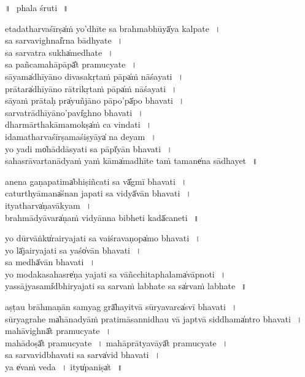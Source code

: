 \documentclass[parskip, DIV=14]{scrartcl}
\begin{document}
\vspace{1cm}
॥\,~phala śruti\,~॥ \\
\vspace{0.5cm}

etadatharvaśīrṣa̍ṁ yo’dhī॒te sa brahmabhūyā̍ya ka॒lpate\,~।\\ sa sarvavighnai̎rna bā॒dhyate\,~।\\
sa sarvatra sukha̍medha॒te\,~।\\
sa pañcamahāpāpā̎t pramu॒cyate\,~।\\
sā॒yama̍dhīyā॒no॒ divasakṛtaṁ pāpa̍ṁ nāśa॒yati\,~।\\ prā॒tara̍dhīyā॒no॒ rātrikṛtaṁ pāpa̍ṁ nāśa॒yati\,~।\\ sāyaṁ prātaḥ pra̍yuñjā॒no॒ pāpo’pā̍po bha॒vati\,~।\\ sarvatrādhīyāno’pavi̍ghno bha॒vati\,~।\\ 
dharmārthakāmamokṣa̍ṁ ca vi॒ndati\,~।\\ idamatharvaśīrṣamaśiṣyāya̍ na de॒yam\,~।\\
yo yadi mo̍hāddā॒syati sa pāpī̍yān bha॒vati\,~।\\ 
sahasrāvartanādyaṁ yaṁ kāma̍madhī॒te taṁ tamane̍na
sā॒dhayet\,~॥\\

\vspace{1cm}

anena gaṇapatima̍bhiṣi॒ñcati sa vā̎gmī bha॒vati\,~।\\
caturthyāmana̍śnan ja॒pati sa vidyā̍vān bha॒vati\,~।\\
ityatharva̍ṇavā॒kyam\,~।\\
brahmādyā॒vara̍ṇaṁ vi॒dyānna bibheti kadā̍cane॒ti\,~॥\\

\vspace{1cm}

yo dūrvāṅku̍rairya॒jati sa vaiśravaṇopa̍mo bha॒vati\,~।\\ yo lā̍jairya॒jati sa yaśo̍vān bha॒vati\,~।\\
sa medhā̍vān bha॒vati\,~।\\
yo modakasahasre̍ṇa ya॒jati sa vāñcchitaphalama̍vāpno॒ti\,~।\\ 
yassājyasami̍dbhirya॒jati sa sarvaṁ labhate sa sa̍rvaṁ
la॒bhate\,~॥\\

\vspace{0.5cm}

aṣṭau brāhmaṇān samyag grā̍hayi॒tvā sūryavarca̍svī bha॒vati\,~।\\
sūryagrahe ma̍hāna॒dyāṁ pratimāsannidhau vā ja॒ptvā siddhama̍ntro bha॒vati\,~।
mahāvighnā̎t pramu॒cyate\,~।\\ mahādoṣā̎t pramu॒cyate\,~।
 mahāprātyavāyā̎t pramu॒cyate\,~।\\
sa sarvavidbhavati sa sarva̍vid bha॒vati\,~।\\ 
ya e̍vaṁ ve॒da\,~।
ityu̍pa॒niṣa̍t\,~॥\\
\end{document}
